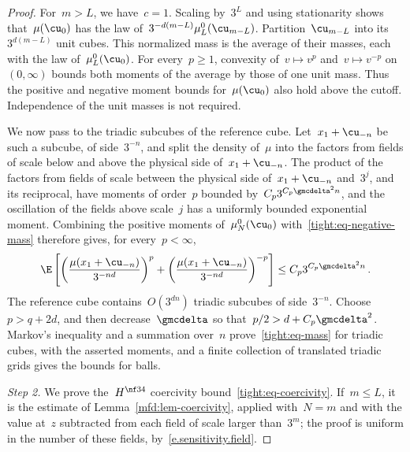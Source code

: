 \documentclass[11pt]{amsart}
\begin{document}
\begin{proof}
\smallskip

For~$m>L$, we have~$c=1$. Scaling by~$3^L$ and using stationarity shows that~$\mu(\cu_0)$ has the law of~$3^{-d(m-L)}\mu_L^0(\cu_{m-L})$. Partition~$\cu_{m-L}$ into its~$3^{d(m-L)}$ unit cubes. This normalized mass is the average of their masses, each with the law of~$\mu_L^0(\cu_0)$. For every~$p\geq1$, convexity of~$v\mapsto v^p$ and~$v\mapsto v^{-p}$ on~$(0,\infty)$ bounds both moments of the average by those of one unit mass. Thus the positive and negative moment bounds for~$\mu(\cu_0)$ also hold above the cutoff. Independence of the unit masses is not required.

\smallskip

We now pass to the triadic subcubes of the reference cube. Let~$x_1+\cu_{-n}$ be such a subcube, of side~$3^{-n}$, and split the density of~$\mu$ into the factors from fields of scale below and above the physical side of~$x_1+\cu_{-n}$. The product of the factors from fields of scale between the physical side of~$x_1+\cu_{-n}$ and~$3^j$, and its reciprocal, have moments of order~$p$ bounded by~$C_p3^{C_p\gmcdelta^2n}$, and the oscillation of the fields above scale~$j$ has a uniformly bounded exponential moment. Combining the positive moments of~$\mu_N^0(\cu_0)$ with~\eqref{tight:eq-negative-mass} therefore gives, for every~$p<\infty$,
\begin{equation*}
	\E\left[
	\left(\frac{\mu(x_1+\cu_{-n})}{3^{-nd}}\right)^p
	+\left(\frac{\mu(x_1+\cu_{-n})}{3^{-nd}}\right)^{-p}\right]
	\leq C_p3^{C_p\gmcdelta^2n}\,.
\end{equation*}
The reference cube contains~$O(3^{dn})$ triadic subcubes of side~$3^{-n}$. Choose~$p>q+2d$, and then decrease~$\gmcdelta$ so that~$p/2>d+C_p\gmcdelta^2$. Markov's inequality and a summation over~$n$ prove~\eqref{tight:eq-mass} for triadic cubes, with the asserted moments, and a finite collection of translated triadic grids gives the bounds for balls.

\smallskip

\emph{Step 2.} We prove the~$H^{\nf34}$ coercivity bound~\eqref{tight:eq-coercivity}. If~$m\leq L$, it is the estimate of Lemma~\ref{mfd:lem-coercivity}, applied with~$N=m$ and with the value at~$z$ subtracted from each field of scale larger than~$3^m$; the proof is uniform in the number of these fields, by~\eqref{e.sensitivity.field}.

\smallskip


\end{proof}
\end{document}
